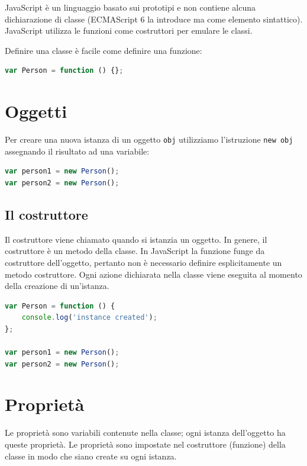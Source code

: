 JavaScript è un linguaggio basato sui prototipi e non contiene alcuna dichiarazione di classe (ECMAScript 6 la introduce ma come elemento sintattico). JavaScript utilizza le funzioni come costruttori per emulare le classi.

Definire una classe è facile come definire una funzione:

\begin{lstlisting}[language=JavaScript]
var Person = function () {};
\end{lstlisting}

\section{Oggetti}

Per creare una nuova istanza di un oggetto \texttt{obj} utilizziamo l'istruzione \texttt{new obj} assegnando il risultato ad una variabile:

\begin{lstlisting}[language=JavaScript]
var person1 = new Person();
var person2 = new Person();
\end{lstlisting}

\subsection{Il costruttore}

Il costruttore viene chiamato quando si istanzia un oggetto. In genere, il costruttore è un metodo della classe. In JavaScript la funzione funge da costruttore dell'oggetto, pertanto non è necessario definire esplicitamente un metodo costruttore. Ogni azione dichiarata nella classe viene eseguita al momento della creazione di un'istanza.

\begin{lstlisting}[language=JavaScript]
var Person = function () {
    console.log('instance created');
};

var person1 = new Person();
var person2 = new Person();
\end{lstlisting}

\section{Proprietà}

Le proprietà sono variabili contenute nella classe; ogni istanza dell'oggetto ha queste proprietà. Le proprietà sono impostate nel costruttore (funzione) della classe in modo che siano create su ogni istanza.


